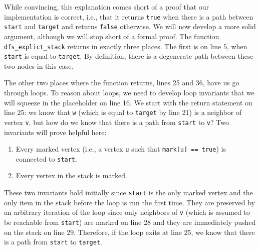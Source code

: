 \medskip

While convincing, this explanation comes short of a proof that our
implementation is correct, i.e., that it returns \lstinline'true' when
there is a path between \lstinline'start' and \lstinline'target' and
returns \lstinline'false' otherwise.  We will now develop a more solid
argument, although we will stop short of a formal proof.  The function
\lstinline'dfs_explict_stack' returns in exactly three places.  The
first is on line 5, when \lstinline'start' is equal to
\lstinline'target'.  By definition, there is a degenerate path between
these two nodes in this case.

The other two places where the function returns,
lines 25 and 36, have us go through loops.
To reason about loops, we need to develop loop invariants that we will
squeeze in the placeholder on line 16.  We start with the
return statement on line 25: we know that \lstinline'w'
(which is equal to \lstinline'target' by line 21) is a
neighbor of vertex \lstinline'v', but how do we know that there is a
path from \lstinline'start' to \lstinline'v'?  Two invariants will
prove helpful here:
\begin{enumerate}\em
\item%
  Every marked vertex (i.e., a vertex \lstinline'u' such that
  \lstinline'mark[u] == true') is connected to \lstinline'start'.
\item%
  Every vertex in the stack is marked.
\end{enumerate}
These two invariants hold initially since \lstinline'start' is the
only marked vertex and the only item in the stack before the loop is
run the first time.  They are preserved by an arbitrary iteration of
the loop since only neighbors of \lstinline'v' (which is assumed to be
reachable from \lstinline'start') are marked on line 28
and they are immediately pushed on the stack on line 29.
Therefore, if the loop exits at line 25, we know that
there is a path from \lstinline'start' to \lstinline'target'.

